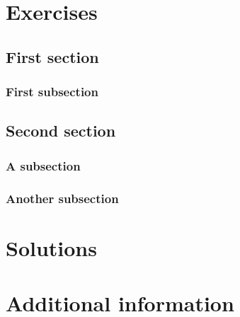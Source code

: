 \documentclass{book}
\begin{document}
\chapter{Exercises}

\section{First section}

\subsection{First subsection}

\section{Second section}

\subsection{A subsection}

\subsection{Another subsection}

\chapter{Solutions}

\chapter{Additional information}
\end{document}
